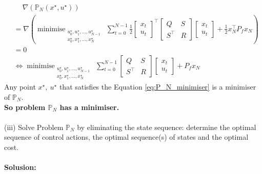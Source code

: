 \documentclass[a4paper,11pt,reqno]{amsart}
\newcommand{\tran}{\intercal}
\DeclareMathOperator*{\minimise}{minimise}
\begin{document}
\begin{align}
    &\quad \ \nabla (\mathbb{P}_N(x^{\star},u^{\star}))
    \\
    &=\nabla \left(
        \minimise_{\substack{u^{\star}_0,u^{\star}_1,\ldots,u^{\star}_{N-1}\\ x^{\star}_0,x^{\star}_1,\ldots,x^{\star}_N}} \,
        \sum_{t=0}^{N-1}\tfrac{1}{2}
        \begin{bmatrix}
            x_t\\
            u_t
        \end{bmatrix}^{\tran}
        \begin{bmatrix}
            Q&S\\
            S^{\tran}&R
        \end{bmatrix}
        \begin{bmatrix}
            x_t\\
            u_t
        \end{bmatrix}
        +\tfrac{1}{2}x_N^{\tran}P_fx_N\right) 
    \\
    &= 0
    \\
    &\Longleftrightarrow 
    \minimise_{\substack{u^{\star}_0,u^{\star}_1,\ldots,u^{\star}_{N-1}\\ x^{\star}_0,x^{\star}_1,\ldots,x^{\star}_N}} \,
    \sum_{t=0}^{N-1}
    \begin{bmatrix}
        Q&S\\
        S^{\tran}&R
    \end{bmatrix}
    \begin{bmatrix}
        x_t\\
        u_t
    \end{bmatrix}
    +P_fx_N
    \label{eq:P_N_minimiser}
\end{align}
Any point $x^{\star},\ u^{\star}$ that satisfies the Equation \eqref{eq:P_N_minimiser} is a minimiser of $\mathbb{P}_N$.
\\
\textbf{So problem $\mathbb{P}_N$ has a minimiser.}
\\ \\
(iii) Solve Problem $\mathbb{P}_N$ by eliminating the state sequence: determine the optimal sequence of control actions, the optimal sequence(s) of states and the optimal cost.
\\ \\
\textbf{Solusion:}
\end{document}
